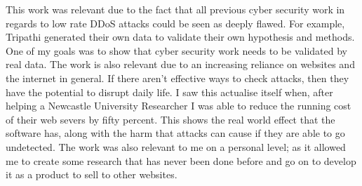 This work was relevant due to the fact that all previous cyber security work in regards to low rate DDoS attacks could be seen as deeply flawed. For example, Tripathi generated their own data to validate their own hypothesis and methods. One of my goals was to show that cyber security work needs to be validated by real data. The work is also relevant due to an increasing reliance on websites and the internet in general. If there aren't effective ways to check attacks, then they have the potential to disrupt daily life. I saw this actualise itself when, after helping a Newcastle University Researcher I was able to reduce the running cost of their web severs by fifty percent. This shows the real world effect that the software has, along with the harm that attacks can cause if they are able to go undetected. The work was also relevant to me on a personal level; as it allowed me to create some research that has never been done before and go on to develop it as a product to sell to other websites.